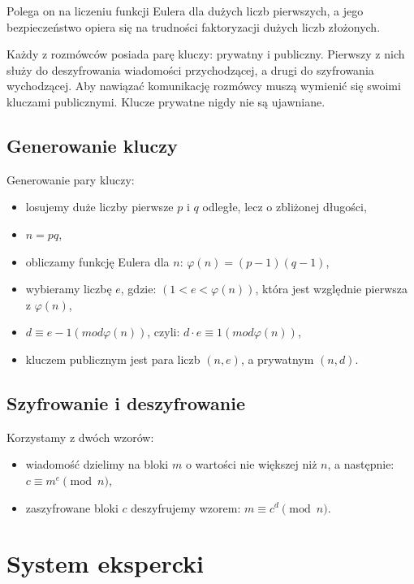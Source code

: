 \documentclass[12pt,a4paper]{article}
\begin{document}
	\smallskip
	Polega on na liczeniu funkcji Eulera dla dużych liczb pierwszych, a jego bezpieczeństwo opiera się na trudności faktoryzacji dużych liczb złożonych.
	
	\smallskip
	Każdy z rozmówców posiada parę kluczy: prywatny i publiczny. Pierwszy z nich służy do deszyfrowania wiadomości przychodzącej, a drugi do szyfrowania wychodzącej. Aby nawiązać komunikację rozmówcy muszą wymienić się swoimi kluczami publicznymi. Klucze prywatne nigdy nie są ujawniane.
	
	
	
	
	\subsection*{Generowanie kluczy}
	Generowanie pary kluczy:
	\begin{itemize}
		\item losujemy duże liczby pierwsze $p$ i $q$ odległe, lecz o zbliżonej długości,
		\item $n = pq$,
		\item obliczamy funkcję Eulera dla $n$: $ \varphi (n)=(p-1)(q-1) $,
		\item wybieramy liczbę $e$, gdzie:  $(1 < e < \varphi(n))$, która jest względnie pierwsza z $\varphi(n)$,
		\item $d ≡ e−1 (mod \varphi(n))$, czyli: $d⋅e ≡ 1 (mod \varphi(n))$,
		\item kluczem publicznym jest para liczb $(n, e)$, a prywatnym $(n, d)$.
	\end{itemize}
	
	
	\subsection*{Szyfrowanie i deszyfrowanie}
	Korzystamy z dwóch wzorów:
	\begin{itemize}
		\item wiadomość dzielimy na bloki $m$ o wartości nie większej niż $n$, a następnie: $c\equiv m^{e}{\pmod {n}}$,
		\item zaszyfrowane bloki $c$ deszyfrujemy wzorem: $m\equiv c^{d}{\pmod {n}}$.
	\end{itemize}
	
	
	
	
	
	
	
	
	
	
\section*{System ekspercki}
\end{document}
